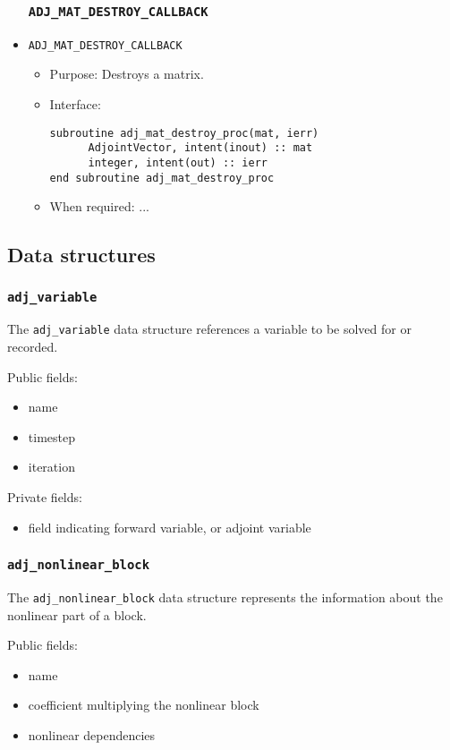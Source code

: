 \documentclass[10pt,authoryear]{elsarticle}
\begin{document}
\begin{itemize}
\subsubsection{\texttt{ADJ\_MAT\_DESTROY\_CALLBACK}}
\item \texttt{ADJ\_MAT\_DESTROY\_CALLBACK}
 \begin{itemize}
 \item Purpose: Destroys a matrix.
 \item Interface:
\begin{verbatim}
subroutine adj_mat_destroy_proc(mat, ierr)
      AdjointVector, intent(inout) :: mat
      integer, intent(out) :: ierr
end subroutine adj_mat_destroy_proc
\end{verbatim}
 \item When required: ...
 \end{itemize}

\end{itemize}


\subsection{Data structures}
\subsubsection{\texttt{{adj\_variable}}}
The \texttt{adj\_variable} data structure references a variable to be solved for or recorded.

Public fields:
\begin{itemize}
\item name
\item timestep
\item iteration
\end{itemize}

Private fields:
\begin{itemize}
\item field indicating forward variable, or adjoint variable
\end{itemize}

\subsubsection{\texttt{{adj\_nonlinear\_block}}}
The \texttt{adj\_nonlinear\_block} data structure represents the information about the nonlinear part
of a block.

Public fields:
\begin{itemize}
\item name
\item coefficient multiplying the nonlinear block
\item nonlinear dependencies
\end{itemize}
\end{document}

